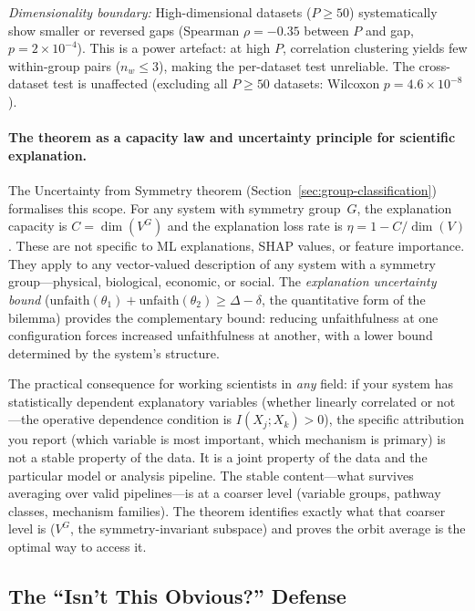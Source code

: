 \documentclass[11pt,a4paper]{article}
\begin{document}
\emph{Dimensionality boundary:} High-dimensional datasets ($P \geq 50$) systematically show smaller or reversed gaps (Spearman $\rho = -0.35$ between $P$ and gap, $p = 2 \times 10^{-4}$).  This is a power artefact: at high $P$, correlation clustering yields few within-group pairs ($n_w \leq 3$), making the per-dataset test unreliable.  The cross-dataset test is unaffected (excluding all $P \geq 50$ datasets: Wilcoxon $p = 4.6 \times 10^{-8}$).

\paragraph{The theorem as a capacity law and uncertainty principle for scientific explanation.}
The Uncertainty from Symmetry theorem (Section~\ref{sec:group-classification}) formalises this scope.  For any system with symmetry group~$G$, the explanation capacity is $C = \dim(V^G)$ and the explanation loss rate is $\eta = 1 - C/\dim(V)$.  These are not specific to ML explanations, SHAP values, or feature importance.  They apply to any vector-valued description of any system with a symmetry group---physical, biological, economic, or social.  The \emph{explanation uncertainty bound} ($\mathrm{unfaith}(\theta_1) + \mathrm{unfaith}(\theta_2) \geq \Delta - \delta$, the quantitative form of the bilemma) provides the complementary bound: reducing unfaithfulness at one configuration forces increased unfaithfulness at another, with a lower bound determined by the system's structure.

The practical consequence for working scientists in \emph{any} field: if your system has statistically dependent explanatory variables (whether linearly correlated or not---the operative dependence condition is $I(X_j; X_k) > 0$), the specific attribution you report (which variable is most important, which mechanism is primary) is not a stable property of the data.  It is a joint property of the data and the particular model or analysis pipeline.  The stable content---what survives averaging over valid pipelines---is at a coarser level (variable groups, pathway classes, mechanism families).  The theorem identifies exactly what that coarser level is ($V^G$, the symmetry-invariant subspace) and proves the orbit average is the optimal way to access it.

\subsection[The Isn't This Obvious Defense]{The ``Isn't This Obvious?'' Defense}
\label{sec:obvious}
\end{document}

